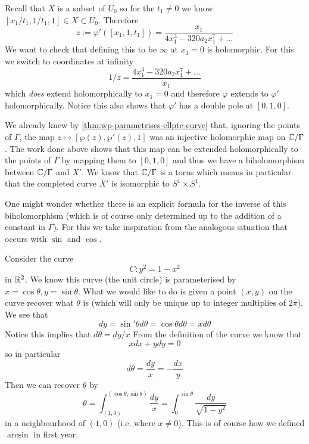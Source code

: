 Recall that $X$ is a subset of $U_0$ so for the $t_1 \neq 0$ we know $[x_1/t_1, 1/t_1, 1] \in X \subset U_0$. Therefore
$$ z := \varphi'([x_1, 1, t_1]) = \frac{x_1}{4x_1^3 - 320a_2 x_1^7 + \dots}$$
We want to check that defining this to be $\infty$ at $x_1 = 0$ is holomorphic. For this we switch to coordinates at infinity 
$$1/z = \frac{4x_1^3 - 320a_2 x_1^7 + \dots}{x_1}$$
which \textit{does} extend holomorphically to $x_1 = 0$ and therefore $\varphi$ extends to $\varphi'$ holomorphically. Notice this also shows that $\varphi'$ has a double pole at $[0, 1, 0]$. 

\secbreak

We already knew by \autoref{thm:wp-parametrises-ellptc-curve} that, ignoring the points of $\Gamma$, the map $z \mapsto [\wp(z), \wp'(z), 1]$ was an injective holomorphic map on $\mathbb{C}/\Gamma$. The work done above shows that this map can be extended holomorphically to the points of $\Gamma$ by mapping them to $[0, 1, 0]$ and thus we have a biholomorphism between $\mathbb{C}/\Gamma$ and $X'$. We know that $\mathbb{C}/\Gamma$ is a torus which means in particular that the completed curve $X'$ is isomorphic to $S^1 \times S^1$. 


One might wonder whether there is an explicit formula for the inverse of this biholomorphism (which is of course only determined up to the addition of a constant in $\Gamma$). For this we take inspiration from the analogous situation that occurs with $\sin$ and $\cos$.

Consider the curve
$$C: y^2 = 1 - x^2$$
in $\mathbb{R}^2$. We know this curve (the unit circle) is parameterised by $x = \cos \theta, y = \sin \theta$. What we would like to do is given a point $(x, y)$ on the curve recover what $\theta$ is (which will only be unique up to integer multiplies of $2\pi$). We see that 
$$dy = \sin' \theta d\theta = \cos \theta d \theta = x d\theta$$
Notice this implies that $d\theta = dy/x$
From the definition of the curve we know that 
$$xdx + ydy = 0 $$
so in particular 
$$d\theta = \frac{dy}{x} = - \frac{dx}{y}$$
Then we can recover $\theta$ by 
$$\theta = \int_{(1, 0)}^{(\cos \theta, \sin \theta)} \frac{dy}{x} = \int_0^{\sin \theta} \frac{dy}{\sqrt{1 - y^2}}$$
in a neighbourhood of $(1, 0)$ (i.e. where $x \neq 0$). This is of course how we defined $\arcsin$ in first year.

